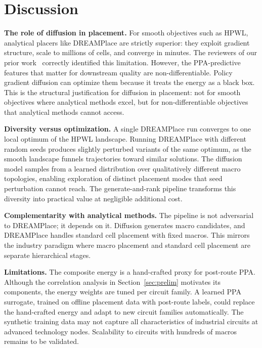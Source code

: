 \documentclass[sigconf,anonymous,review,9pt]{acmart}
\begin{document}
\section{Discussion}
\label{sec:discussion}

\textbf{The role of diffusion in placement.}
For smooth objectives such as HPWL, analytical placers like DREAMPlace
are strictly superior: they exploit gradient structure, scale to millions
of cells, and converge in minutes. The reviewers of our prior
work~\cite{chen2026dac} correctly identified this limitation. However,
the PPA-predictive features that matter for downstream quality are
non-differentiable. Policy gradient diffusion can optimize them because
it treats the energy as a black box. This is the structural
justification for diffusion in placement: not for smooth objectives
where analytical methods excel, but for non-differentiable objectives
that analytical methods cannot access.

\textbf{Diversity versus optimization.}
A single DREAMPlace run converges to one local optimum of the HPWL
landscape. Running DREAMPlace with different random seeds produces
slightly perturbed variants of the same optimum, as the smooth landscape
funnels trajectories toward similar solutions. The diffusion model
samples from a learned distribution over qualitatively different macro
topologies, enabling exploration of distinct placement modes that seed
perturbation cannot reach. The generate-and-rank pipeline transforms
this diversity into practical value at negligible additional cost.

\textbf{Complementarity with analytical methods.}
The pipeline is not adversarial to DREAMPlace; it depends on it.
Diffusion generates macro candidates, and DREAMPlace handles standard
cell placement with fixed macros. This mirrors the industry paradigm
where macro placement and standard cell placement are separate
hierarchical stages.

\textbf{Limitations.}
The composite energy is a hand-crafted proxy for post-route PPA.
Although the correlation analysis in Section~\ref{sec:prelim}
motivates its components, the energy weights are tuned per circuit
family. A learned PPA surrogate, trained on offline placement data with
post-route labels, could replace the hand-crafted energy and adapt to
new circuit families automatically. The synthetic training data may not
capture all characteristics of industrial circuits at advanced technology
nodes. Scalability to circuits with hundreds of macros remains to be
validated.
\end{document}
